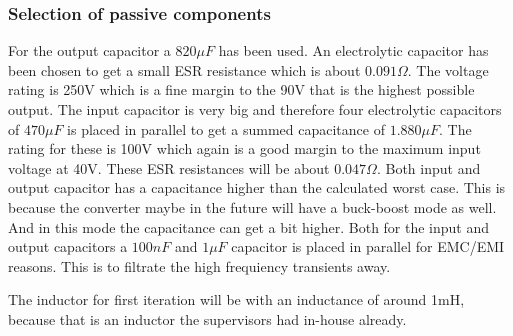 \subsubsection{Selection of passive components}
For the output capacitor a $820\mu F$ has been used.  An electrolytic capacitor has been chosen to get a small ESR resistance which is about $0.091\Omega$. The voltage rating is 250V which is a fine margin to the 90V that is the highest possible output.
The input capacitor is very big and therefore four electrolytic capacitors of $470\mu F$  is placed in parallel to get a summed capacitance of $1.880\mu F$. The rating for these is 100V which again is a good margin to the maximum input voltage at 40V. These ESR resistances will be about $0.047\Omega$. Both input and output capacitor has a capacitance higher than the calculated worst case. This is because the converter maybe in the future will have a buck-boost mode as well. And in this mode the capacitance can get a bit higher. 
Both for the input and output capacitors a $100nF$ and $1\mu F$ capacitor is placed in parallel for EMC/EMI reasons. This is to filtrate the high frequiency transients away. 

The inductor for first iteration will be with an inductance of around 1mH,  because that is an inductor the supervisors had in-house already.     